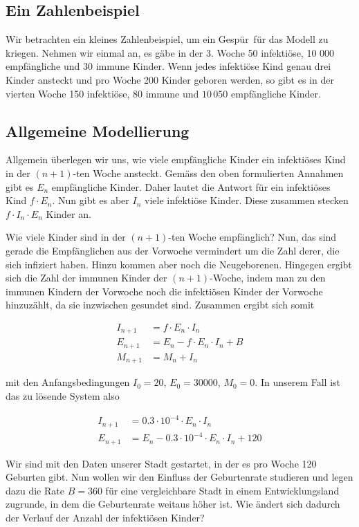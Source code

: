 \documentclass[%
<<<<<<< Updated upstream
11pt,%
twoside,%
titlepage,%
german,%
headsepline%
]{scrartcl}
\begin{document}
\subsection*{Ein Zahlenbeispiel}

Wir betrachten ein kleines Zahlenbeispiel, um ein \glqq Gespür\grqq\ für das Modell zu kriegen. Nehmen wir einmal an, es gäbe in der 3. Woche 50 infektiöse, 10 000 empfängliche und 30 immune Kinder. Wenn jedes infektiöse Kind genau drei Kinder ansteckt und pro Woche 200 Kinder geboren werden, so gibt es in der vierten Woche 150 infektiöse, 80 immune und $10\,050$ empfängliche Kinder.

\subsection{Allgemeine Modellierung}

Allgemein überlegen wir uns, wie viele empfängliche Kinder ein infektiöses Kind in der $(n+ 1)$-ten Woche ansteckt. Gemäss den oben formulierten Annahmen gibt es $E_n$ empfängliche Kinder. Daher lautet die Antwort für ein infektiöses Kind $f\cdot E_n$. Nun gibt es aber $I_n$ viele infektiöse Kinder. Diese zusammen stecken $f\cdot I_n\cdot E_n$ Kinder an.

Wie viele Kinder sind in der $(n+1)$-ten Woche empfänglich? Nun, das sind gerade die Empfänglichen aus der Vorwoche vermindert um die Zahl derer, die sich infiziert haben. Hinzu kommen aber noch die Neugeborenen. Hingegen ergibt sich die Zahl der immunen Kinder der $(n+1)$-Woche, indem man zu den immunen Kindern der Vorwoche noch die infektiösen Kinder der Vorwoche hinzuzählt, da sie inzwischen gesundet sind. Zusammen ergibt sich somit

\begin{align*}
I_{n+1} &= f\cdot E_n\cdot I_n\\
E_{n+1} &= E_n-f\cdot E_n\cdot I_n+B\\
M_{n+1} &= M_n+I_n
\end{align*}

mit den Anfangsbedingungen $I_0=20$, $E_0=30000$, $M_0=0$. In unserem Fall ist das zu lösende System also

\begin{align*}
I_{n+1} &= 0.3\cdot10^{-4}\cdot E_n\cdot I_n\\
E_{n+1} &= E_n-0.3\cdot10^{-4}\cdot E_n\cdot I_n+120
\end{align*}

Wir sind mit den Daten unserer Stadt gestartet, in der es pro Woche 120 Geburten gibt. Nun wollen wir den Einfluss der Geburtenrate studieren und legen dazu die Rate $B=360$ für eine vergleichbare Stadt in einem Entwicklungsland zugrunde, in dem die Geburtenrate weitaus höher ist. Wie ändert sich dadurch der Verlauf der Anzahl der infektiösen Kinder?
\end{document}

